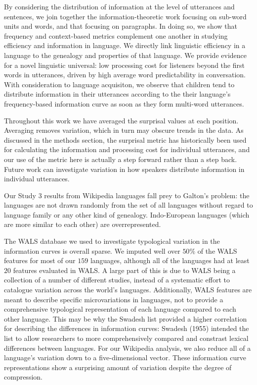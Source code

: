\documentclass[man,floatsintext]{apa6}
\begin{document}
By considering the distribution of information at the level of utterances and sentences, we join together the information-theoretic work focusing on sub-word units and words, and that focusing on paragraphs. In doing so, we show that frequency and context-based metrics complement one another in studying efficiency and information in language. We directly link linguistic efficiency in a language to the genealogy and properties of that language. We provide evidence for a novel linguistic universal: low processing cost for listeners beyond the first words in utterances, driven by high average word predictability in conversation. With consideration to language acquisiton, we observe that children tend to distribute information in their utterances according to the their language's frequency-based information curve as soon as they form multi-word utterances.

Throughout this work we have averaged the surprisal values at each position. Averaging removes variation, which in turn may obscure trends in the data. As discussed in the methods section, the surprisal metric has historically been used for calculating the information and processing cost for individual utterances, and our use of the metric here is actually a step forward rather than a step back. Future work can investigate variation in how speakers distribute information in individual utterances.

Our Study 3 results from Wikipedia languages fall prey to Galton's problem: the languages are not drawn randomly from the set of all languages without regard to language family or any other kind of genealogy. Indo-European languages (which are more similar to each other) are overrepresented.

The WALS database we used to investigate typological variation in the information curves is overall sparse. We imputed well over \(50\%\) of the WALS features for most of our \(159\) languages, although all of the languages had at least \(20\) features evaluated in WALS. A large part of this is due to WALS being a collection of a number of different studies, instead of a systematic effort to catalogue variation across the world's languages. Additionally, WALS features are meant to describe specific microvariations in languages, not to provide a comprehensive typological representation of each language compared to each other language. This may be why the Swadesh list provided a higher correlation for describing the differences in information curves: Swadesh (1955) intended the list to allow researchers to more comprehensively compared and constrast lexical differences between languages. For our Wikipedia analysis, we also reduce all of a language's variation down to a five-dimensional vector. These information curve representations show a surprising amount of variation despite the degree of compression.
\end{document}
